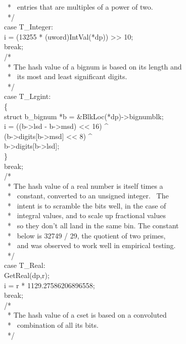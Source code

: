 {\>\>\>\ * \ entries that are multiples of a power of two.\\
\>\>\>\ */\\
\>\>\>case T\_Integer:\\
\>\>\>\>i = (13255 * (uword)IntVal(*dp)) >> 10;\\
\>\>\>\>break;\\
\>\>\>/*\\
\>\>\>\ * The hash value of a bignum is based on its length and \\
\>\>\>\ * \ its most and least significant digits.\\
\>\>\>\ */\\
\>\>case T\_Lrgint:\\
\>\>\>\{\\
\>\>\>struct b\_bignum *b = \&BlkLoc(*dp)->bignumblk;\\
\>\>\>i = ((b->lsd - b->msd) <{}< 16) \^{}\\
\>\>\>\>(b->digits[b->msd] <{}< 8) \^{}\\
\>\>\>\>b->digits[b->lsd];\\
\>\>\>\}\\
\>\>\>break;\\
\>\>\>/*\\
\>\>\>\ * The hash value of a real number is itself times a \\
\>\>\>\ * \ constant, converted to an unsigned integer. \ The \\
\>\>\>\ * \ intent is to scramble the bits well, in the case of \\
\>\>\>\ * \ integral values, and to scale up fractional values \\
\>\>\>\ * \ so they don't all land in the same bin. The constant\\
\>\>\>\ * \ below is 32749 / 29, the quotient of two primes,\\
\>\>\>\ * \ and was observed to work well in empirical testing.\\
\>\>\>\ */\\
\>\>\>case T\_Real:\\
\>\>\>\>GetReal(dp,r);\\
\>\>\>\>i = r * 1129.27586206896558;\\
\>\>\>\>break;\\
\>\>\>/*\\
\>\>\>\ * The hash value of a cset is based on a convoluted \\
\>\>\>\ * \ combination of all its bits.\\
\>\>\>\ */\\
}
